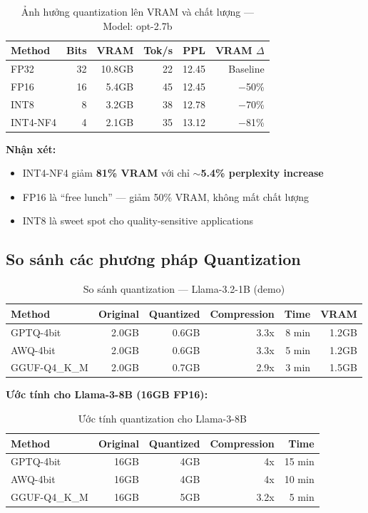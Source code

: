 \documentclass[12pt,a4paper]{report}
\begin{document}
\begin{table}[h]
\centering
\caption{Ảnh hưởng quantization lên VRAM và chất lượng --- Model: opt-2.7b}
\label{tab:quant-results}
\begin{tabular}{lrrrrr}
\toprule
\textbf{Method} & \textbf{Bits} & \textbf{VRAM} & \textbf{Tok/s} & \textbf{PPL} & \textbf{VRAM $\Delta$} \\
\midrule
FP32 & 32 & 10.8GB & 22 & 12.45 & Baseline \\
FP16 & 16 & 5.4GB & 45 & 12.45 & $-$50\% \\
INT8 & 8 & 3.2GB & 38 & 12.78 & $-$70\% \\
INT4-NF4 & 4 & 2.1GB & 35 & 13.12 & $-$81\% \\
\bottomrule
\end{tabular}
\end{table}

\textbf{Nhận xét:}
\begin{itemize}
  \item INT4-NF4 giảm \textbf{81\% VRAM} với chỉ \textbf{$\sim$5.4\% perplexity increase}
  \item FP16 là ``free lunch'' --- giảm 50\% VRAM, không mất chất lượng
  \item INT8 là sweet spot cho quality-sensitive applications
\end{itemize}

\subsection{So sánh các phương pháp Quantization}

\begin{table}[h]
\centering
\caption{So sánh quantization --- Llama-3.2-1B (demo)}
\label{tab:quant-methods-results}
\begin{tabular}{lrrrrr}
\toprule
\textbf{Method} & \textbf{Original} & \textbf{Quantized} & \textbf{Compression} & \textbf{Time} & \textbf{VRAM} \\
\midrule
GPTQ-4bit & 2.0GB & 0.6GB & 3.3x & 8 min & 1.2GB \\
AWQ-4bit & 2.0GB & 0.6GB & 3.3x & 5 min & 1.2GB \\
GGUF-Q4\_K\_M & 2.0GB & 0.7GB & 2.9x & 3 min & 1.5GB \\
\bottomrule
\end{tabular}
\end{table}

\textbf{Ước tính cho Llama-3-8B (16GB FP16):}

\begin{table}[h]
\centering
\caption{Ước tính quantization cho Llama-3-8B}
\label{tab:llama8b-estimate}
\begin{tabular}{lrrrr}
\toprule
\textbf{Method} & \textbf{Original} & \textbf{Quantized} & \textbf{Compression} & \textbf{Time} \\
\midrule
GPTQ-4bit & 16GB & 4GB & 4x & 15 min \\
AWQ-4bit & 16GB & 4GB & 4x & 10 min \\
GGUF-Q4\_K\_M & 16GB & 5GB & 3.2x & 5 min \\
\bottomrule
\end{tabular}
\end{table}
\end{document}
